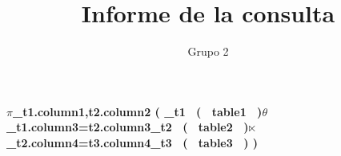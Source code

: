 \documentclass{article}
\begin{document}
\title{Informe de la consulta}
\author{Grupo 2}
\maketitle
\textbf{\Large{\newline$\pi$_{t1.column1,t2.column2}
( \rho_{t1} \ ( \ table1 \ )$\theta$_{t1.column3=t2.column3}\rho_{t2} \ ( \ table2 \ )$\ltimes$_{t2.column4=t3.column4}\rho_{t3} \ ( \ table3 \ ) )
}
}
\end{document}

